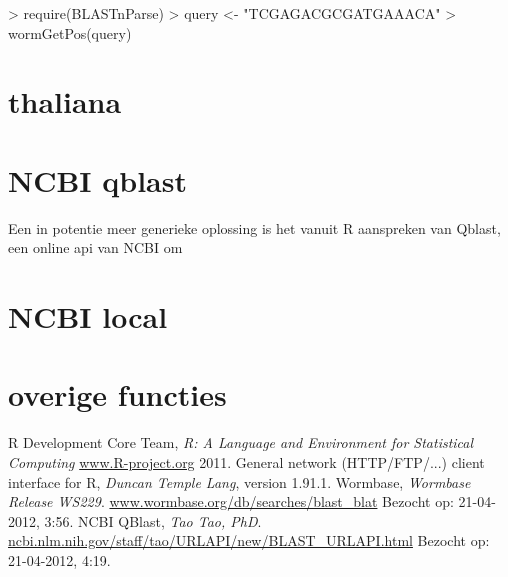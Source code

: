 \documentclass[a4paper]{article}
\begin{document}
\begin{Schunk}
\begin{Sinput}
> require(BLASTnParse)
> query <- "TCGAGACGCGATGAAACA"
> wormGetPos(query)
\end{Sinput}
\end{Schunk}
\section*{thaliana}
\section*{NCBI qblast}
Een in potentie meer generieke oplossing is het vanuit R aanspreken van Qblast\cite{qblast}, een online api van NCBI om
\section*{NCBI local}
\section*{overige functies}

\renewcommand{\refname}{Referenties}
\begin{thebibliography}{9}
    R Development Core Team, \emph{R: A Language and Environment for Statistical Computing}
    \url{www.R-project.org} 2011.
    General network (HTTP/FTP/...) client interface for R, \emph{Duncan Temple Lang}, version 1.91.1.
    Wormbase, \emph{Wormbase Release WS229}. \url{www.wormbase.org/db/searches/blast_blat} Bezocht op: 21-04-2012, 3:56.
    NCBI QBlast, \emph{Tao Tao, PhD}. \url{ncbi.nlm.nih.gov/staff/tao/URLAPI/new/BLAST_URLAPI.html} Bezocht op: 21-04-2012, 4:19.
\end{thebibliography}
\end{document}
